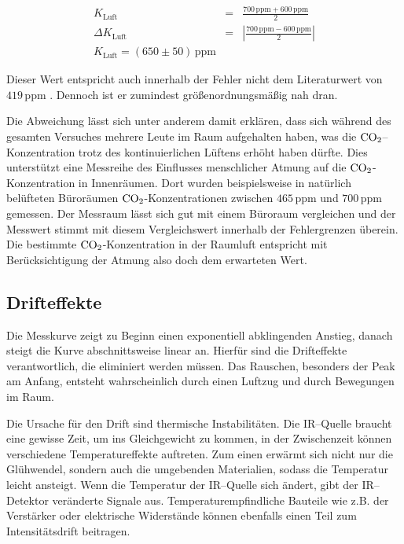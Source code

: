 \documentclass[12pt,a4paper]{scrartcl}
\numberwithin{equation}{section} %
\begin{document}
	\begin{eqnarray}
		K_\mathrm{Luft} &=& \frac{700 \mathrm{\, ppm} + 600 \mathrm{\, ppm}}{2} \\
		\Delta K_\mathrm{Luft} &=& \left|\frac{700 \mathrm{\, ppm} - 600 \mathrm{\, ppm}}{2}\right| \\
		K_\mathrm{Luft} = (650 \pm 50) \mathrm{\, ppm}
	\end{eqnarray}
	
	Dieser Wert entspricht auch innerhalb der Fehler nicht dem Literaturwert von $419 \mathrm{\, ppm}$ \cite{Kohlendioxid Anteil}. Dennoch ist er zumindest größenordnungsmäßig nah dran.
	
	Die Abweichung lässt sich unter anderem damit erklären, dass sich während des gesamten Versuches mehrere Leute im Raum aufgehalten haben, was die $\ce{CO_2}$--Konzentration trotz des kontinuierlichen Lüftens erhöht haben dürfte. Dies unterstützt eine Messreihe des Einflusses menschlicher Atmung auf die $\ce{CO_2}$-Konzentration in Innenräumen. \cite{Kohlendioxid Innenraum} Dort wurden beispielsweise in natürlich belüfteten Büroräumen $\ce{CO_2}$-Konzentrationen zwischen $465 \mathrm{\, ppm}$ und $700 \mathrm{\, ppm}$ gemessen. Der Messraum lässt sich gut mit einem Büroraum vergleichen und der Messwert stimmt mit diesem Vergleichswert innerhalb der Fehlergrenzen überein. Die bestimmte $\ce{CO_2}$-Konzentration in der Raumluft entspricht mit Berücksichtigung der Atmung also doch dem erwarteten Wert.
	
	\subsection{Drifteffekte}
	\label{Drifteffekte}
	
	Die Messkurve zeigt zu Beginn einen exponentiell abklingenden Anstieg, danach steigt die Kurve abschnittsweise linear an. Hierfür sind die Drifteffekte verantwortlich, die eliminiert werden müssen. Das Rauschen, besonders der Peak am Anfang, entsteht wahrscheinlich durch einen Luftzug und durch Bewegungen im Raum.
	
	Die Ursache für den Drift sind thermische Instabilitäten. Die IR--Quelle braucht eine gewisse Zeit, um ins Gleichgewicht zu kommen, in der Zwischenzeit können verschiedene Temperatureffekte auftreten. Zum einen erwärmt sich nicht nur die Glühwendel, sondern auch die umgebenden Materialien, sodass die Temperatur leicht ansteigt. Wenn die Temperatur der IR--Quelle sich ändert, gibt der IR--Detektor veränderte Signale aus. Temperaturempfindliche Bauteile wie z.B. der Verstärker oder elektrische Widerstände können ebenfalls einen Teil zum Intensitätsdrift beitragen.
	
\end{document}
